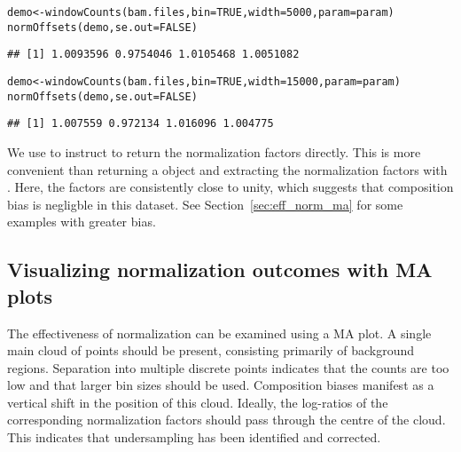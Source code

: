 \documentclass{report}\usepackage[]{graphicx}\usepackage[usenames,dvipsnames]{color}
\newcommand{\hlnum}[1]{\textcolor[rgb]{0.816,0.125,0.439}{#1}}%
\newcommand{\hlstd}[1]{\textcolor[rgb]{0.251,0.251,0.251}{#1}}%
\newcommand{\hlkwb}[1]{\textcolor[rgb]{0,0,0}{#1}}%
\newcommand{\hlkwc}[1]{\textcolor[rgb]{0.251,0.251,0.251}{#1}}%
\newcommand{\hlkwd}[1]{\textcolor[rgb]{0.878,0.439,0.125}{#1}}%
\newenvironment{knitrout}{}{} %
\begin{document}
\begin{knitrout}
\color{fgcolor}\begin{kframe}
\begin{alltt}
\hlstd{demo} \hlkwb{<-} \hlkwd{windowCounts}\hlstd{(bam.files,} \hlkwc{bin}\hlstd{=}\hlnum{TRUE}\hlstd{,} \hlkwc{width}\hlstd{=}\hlnum{5000}\hlstd{,} \hlkwc{param}\hlstd{=param)}
\hlkwd{normOffsets}\hlstd{(demo,} \hlkwc{se.out}\hlstd{=}\hlnum{FALSE}\hlstd{)}
\end{alltt}
\begin{verbatim}
## [1] 1.0093596 0.9754046 1.0105468 1.0051082
\end{verbatim}
\begin{alltt}
\hlstd{demo} \hlkwb{<-} \hlkwd{windowCounts}\hlstd{(bam.files,} \hlkwc{bin}\hlstd{=}\hlnum{TRUE}\hlstd{,} \hlkwc{width}\hlstd{=}\hlnum{15000}\hlstd{,} \hlkwc{param}\hlstd{=param)}
\hlkwd{normOffsets}\hlstd{(demo,} \hlkwc{se.out}\hlstd{=}\hlnum{FALSE}\hlstd{)}
\end{alltt}
\begin{verbatim}
## [1] 1.007559 0.972134 1.016096 1.004775
\end{verbatim}
\end{kframe}
\end{knitrout}

We use  to instruct  to return the normalization factors directly.
This is more convenient than returning a  object and extracting the normalization factors with .
Here, the factors are consistently close to unity, which suggests that composition bias is negligble in this dataset.
See Section~\ref{sec:eff_norm_ma} for some examples with greater bias.

\subsection{Visualizing normalization outcomes with MA plots}
The effectiveness of normalization can be examined using a MA plot. 
A single main cloud of points should be present, consisting primarily of background regions.
Separation into multiple discrete points indicates that the counts are too low and that larger bin sizes should be used. 
Composition biases manifest as a vertical shift in the position of this cloud. 
Ideally, the log-ratios of the corresponding normalization factors should pass through the centre of the cloud. 
This indicates that undersampling has been identified and corrected.
\end{document}
